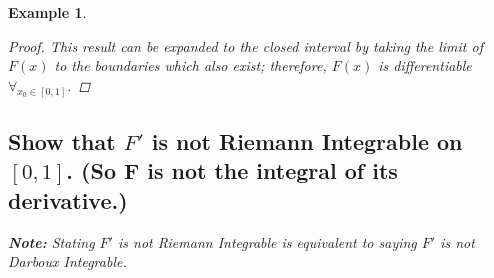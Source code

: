 \documentclass[]{article}
\newcommand{\N}{\mathbb{N}}
\newcommand{\st}{\ : \ }
\newtheorem{example}{Example}
\begin{document}
\begin{example}
\begin{proof}
        This result can be expanded to the closed interval by taking the limit of $F(x)$ to the boundaries which also exist; therefore, $F(x)$ is differentiable $\forall_{x_0 \in [0,1]}$.
    \end{proof}
    \subsection{Show that $F'$ is not Riemann Integrable on $[0,1]$. (So F is not the integral of its derivative.)}
    \textbf{Note:}
    Stating $F'$ is not Riemann Integrable is equivalent to saying $F'$ is not Darboux Integrable.


    
    





\end{example}
\end{document}
